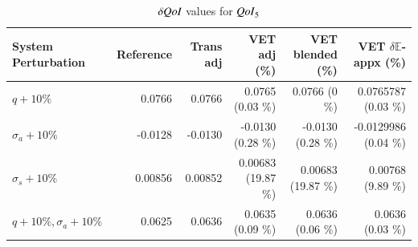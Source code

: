 \documentclass{anstrans}
\newcommand{\Edd}{\mathbb{E}}
\newcommand{\sigs}{\sigma_s}
\newcommand{\siga}{\sigma_a}
\newcommand{\qoi}{{\it QoI}\xspace}
\begin{document}
\begin{table}
  \centering
  \caption{$\delta \qoi$ values for $\qoi_5$}
  \begin{tabular}{l|rr|rrr}\toprule
  System Perturbation    & Reference     & Trans adj     & VET adj \hspace{1mm} (\%)    &   VET blended \hspace{1mm} (\%)   & VET $\delta \Edd$-appx  \hspace{1mm} (\%) 
\\ \midrule
$q+10\%$  & 0.0766  & 0.0766  & 0.0765 \hspace{1mm} (0.03 \%)  & 0.0766   \hspace{1mm} (0 \%) & 0.0765787  \hspace{1mm} (0.03 \%)
\\
$\siga+10\%$  &-0.0128  & -0.0130 & -0.0130   \hspace{1mm} (0.28 \%) & -0.0130  \hspace{1mm} (0.28 \%) & -0.0129986  \hspace{1mm} (0.04 \%) 
\\
$\sigs+10\%$  & 0.00856  & 0.00852  & 0.00683  \hspace{1mm} (19.87 \%)  & 0.00683   \hspace{1mm} (19.87 \%) & 0.00768   \hspace{1mm} (9.89 \%)
\\
$q+10\%,\siga+10\%$  & 0.0625 & 0.0636  & 0.0635 \hspace{1mm} (0.09 \%) & 0.0636 \hspace{1mm} (0.06 \%)  &  0.0636  \hspace{1mm} (0.03 \%)
\\
\bottomrule
\end{tabular}
  \label{tab:qoi1}
\end{table}
\end{document}
